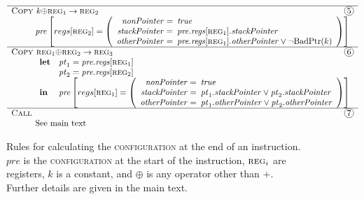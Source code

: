 \begin{figure}
\begin{displaymath}
\begin{array}{l}
    \hline
    \textsc{Copy } k {\oplus} \textsc{reg}_1 \rightarrow \textsc{reg}_2 \hfill \circled{5}\\
    \hspace{10mm}\mathit{pre}\left[regs[\textsc{reg}_2] = \left(\begin{array}{rl}
        \mathit{nonPointer} = & \!\!\!\true\\
        \mathit{stackPointer} = & \!\!\!\mathit{pre}.\mathit{regs}[\textsc{reg}_1].\mathit{stackPointer}\\
        \mathit{otherPointer} = & \!\!\!\mathit{pre}.\mathit{regs}[\textsc{reg}_1].\mathit{otherPointer} \vee {\neg}\smBadPtr{k}\\
      \end{array}\right)\right]\\
    \hline
    \textsc{Copy } \textsc{reg}_1 {\oplus} \textsc{reg}_2 \rightarrow \textsc{reg}_3 \hfill \circled{6}\\
    \hspace{10mm}\begin{array}{ll}
      \mathbf{let} & \mathit{pt}_1 = \mathit{pre}.\mathit{regs}[\textsc{reg}_1]\\
                   & \mathit{pt}_2 = \mathit{pre}.\mathit{regs}[\textsc{reg}_2]\\
      \mathbf{in}  & \mathit{pre}\left[regs[\textsc{reg}_1] = \left(\begin{array}{rl}
          \mathit{nonPointer} = & \!\!\!\mathit{true}\\
          \mathit{stackPointer} = & \!\!\!\mathit{pt}_1.\mathit{stackPointer} \vee \mathit{pt}_2.\mathit{stackPointer}\\
          \mathit{otherPointer} = & \!\!\!\mathit{pt}_1.\mathit{otherPointer} \vee \mathit{pt}_2.\mathit{otherPointer}\\
        \end{array}\right)\right]
    \end{array}\\
    \hline
    \textsc{Call} \hfill \circled{7}\\
    \hspace{10mm}\textrm{See main text}
  \end{array}
  \end{displaymath}
  \caption{Rules for calculating the \textsc{configuration} at the end
    of an instruction.  $\mathit{pre}$ is the \textsc{configuration}
    at the start of the instruction, $\textsc{reg}_i$ are registers,
    $k$ is a constant, and $\oplus$ is any operator other than $+$.
    Further details are given in the main text.}
  \label{fig:static_alias:update_rules}
\end{figure}


